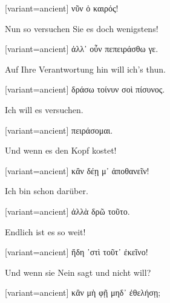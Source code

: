 \begin{greek}[variant=ancient]%
νῦν ὁ καιρός!

\end{greek}%
\switchcolumn*

Nun so versuchen Sie es doch wenigstens! 

\switchcolumn

\begin{greek}[variant=ancient]%
ἀλλ᾽ οὖν πεπειράσθω γε.

\end{greek}%
\switchcolumn*

Auf Ihre Verantwortung hin will ich's thun. 

\switchcolumn

\begin{greek}[variant=ancient]%
δράσω τοίνυν σοὶ πίσυνος.

\end{greek}%
\switchcolumn*

Ich will es versuchen. 

\switchcolumn

\begin{greek}[variant=ancient]%
πειράσομαι.

\end{greek}%
\switchcolumn*

Und wenn es den Kopf kostet! 

\switchcolumn

\begin{greek}[variant=ancient]%
κἂν δέῃ μ᾽ ἀποθανεῖν!

\end{greek}%
\switchcolumn*

Ich bin schon darüber. 

\switchcolumn

\begin{greek}[variant=ancient]%
ἀλλὰ δρῶ τοῦτο.

\end{greek}%
\switchcolumn*

Endlich ist es so weit! 

\switchcolumn

\begin{greek}[variant=ancient]%
ἤδη ᾽στὶ τοῦτ᾽ ἐκεῖνο!

\end{greek}%
\switchcolumn*

Und wenn sie Nein sagt und nicht will? 

\switchcolumn

\begin{greek}[variant=ancient]%
κἂν μὴ φῇ μηδ᾽ ἐθελήσῃ;

\end{greek}%
\switchcolumn*

